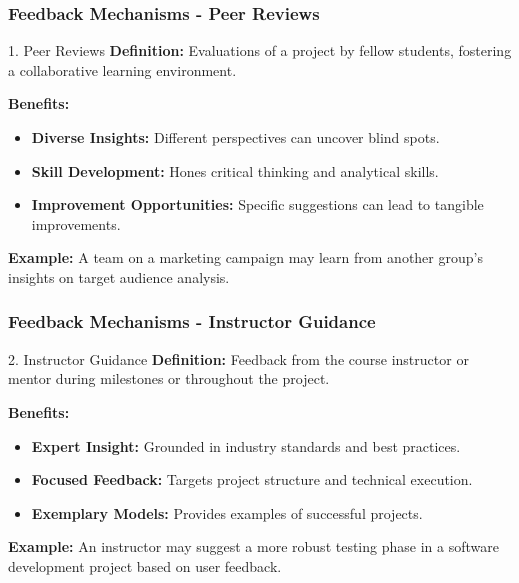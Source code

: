 \documentclass[aspectratio=169]{beamer}
\begin{document}
\begin{frame}[fragile]
    \frametitle{Feedback Mechanisms - Peer Reviews}
    \begin{block}{1. Peer Reviews}
        \textbf{Definition:} Evaluations of a project by fellow students, fostering a collaborative learning environment.

        \textbf{Benefits:}
        \begin{itemize}
            \item \textbf{Diverse Insights:} Different perspectives can uncover blind spots.
            \item \textbf{Skill Development:} Hones critical thinking and analytical skills.
            \item \textbf{Improvement Opportunities:} Specific suggestions can lead to tangible improvements.
        \end{itemize}
        
        \textbf{Example:} A team on a marketing campaign may learn from another group's insights on target audience analysis.
    \end{block}
\end{frame}

\begin{frame}[fragile]
    \frametitle{Feedback Mechanisms - Instructor Guidance}
    \begin{block}{2. Instructor Guidance}
        \textbf{Definition:} Feedback from the course instructor or mentor during milestones or throughout the project.

        \textbf{Benefits:}
        \begin{itemize}
            \item \textbf{Expert Insight:} Grounded in industry standards and best practices.
            \item \textbf{Focused Feedback:} Targets project structure and technical execution.
            \item \textbf{Exemplary Models:} Provides examples of successful projects.
        \end{itemize}
        
        \textbf{Example:} An instructor may suggest a more robust testing phase in a software development project based on user feedback.
    \end{block}
\end{frame}
\end{document}
